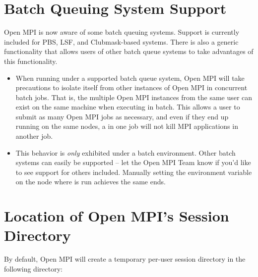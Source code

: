 \section{Batch Queuing System Support}
\label{sec:misc-batch}

Open MPI is now aware of some batch queuing systems.  Support is currently
included for PBS, LSF, and Clubmask-based
systems.  There is also a generic functionality that allows users of
other batch queue systems to take advantages of this functionality.

\begin{itemize}
\item When running under a supported batch queue system, Open MPI will take
  precautions to isolate itself from other instances of Open MPI in
  concurrent batch jobs.  That is, the multiple Open MPI instances from the
  same user can exist on the same machine when executing in batch.
  This allows a user to submit as many Open MPI jobs as necessary, and even
  if they end up running on the same nodes, a  in one
  job will not kill MPI applications in another job.
  
\item This behavior is {\em only} exhibited under a batch environment.
  Other batch systems can easily be supported -- let the Open MPI Team know
  if you'd like to see support for others included.  Manually setting
  the environment variable 
  on the node where  is run achieves the same ends.
 \end{itemize}


\section{Location of Open MPI's Session Directory}
\label{sec:misc-session-directory}

By default, Open MPI will create a temporary per-user session directory
in the following directory:

